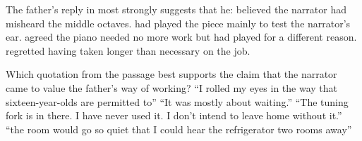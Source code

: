 \documentclass[11pt]{article}
\begin{document}
{The father's reply in  most strongly suggests that he:}
{believed the narrator had misheard the middle octaves.}
{had played the piece mainly to test the narrator's ear.}
{agreed the piano needed no more work but had played for a different reason.}
{regretted having taken longer than necessary on the job.}

{Which quotation from the passage best supports the claim that the narrator came to value the father's way of working?}
{``I rolled my eyes in the way that sixteen-year-olds are permitted to''}
{``It was mostly about waiting.''}
{``The tuning fork is in there. I have never used it. I don't intend to leave home without it.''}
{``the room would go so quiet that I could hear the refrigerator two rooms away''}
\end{document}
